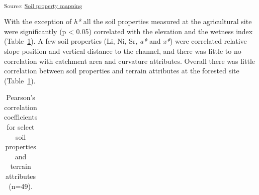 \documentclass[
  number]{elsarticle}
\begin{document}
\textsubscript{Source:
\href{https://alex-koiter.github.io/terrain-attributes/notebooks/property_maps.qmd.html\#cell-fig-forest_map}{Soil
property mapping}}

With the exception of \emph{h*} all the soil properties measured at the
agricultural site were significantly (p \textless{} 0.05) correlated
with the elevation and the wetness index (Table~\ref{tbl-correlation}).
A few soil properties (Li, Ni, Sr, \emph{a*} and \emph{x*}) were
correlated relative slope position and vertical distance to the channel,
and there was little to no correlation with catchment area and curvature
attributes. Overall there was little correlation between soil properties
and terrain attributes at the forested site
(Table~\ref{tbl-correlation}).

\begin{longtable}[]{@{}cccccccc@{}}

\caption{\label{tbl-correlation}Pearson's correlation coefficients for
select soil properties and terrain attributes (n=49).}

\tabularnewline


\end{longtable}
\end{document}
